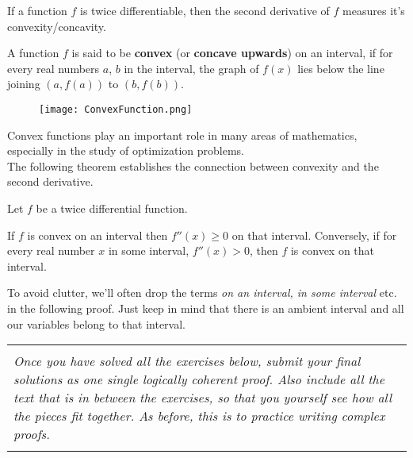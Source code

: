 If a function $f$ is twice differentiable, then the second derivative of $f$ measures it's convexity/concavity.
\begin{definition}
	A function $f$ is said to be {\bf convex} (or {\bf concave upwards}) on an interval, if for every real numbers $a$, $b$ in the interval, the graph of $f(x)$ lies below the line joining $(a,f(a))$ to $(b,f(b))$.
	\begin{figure}[H]
		\centering
		\texttt{[image: ConvexFunction.png]}
	\end{figure}
\end{definition}
Convex functions play an important role in many areas of mathematics, especially in the study of optimization problems.\\

The following theorem establishes the connection between convexity and the second derivative.
\begin{theorem}
	\label{thm:convex_functions}
	Let $f$ be a twice differential function.

	If $f$ is convex on an interval then $f''(x) \ge 0$ on that interval. Conversely, if for every real number $x$ in some interval, $f''(x) > 0$, then $f$ is convex on that interval.
\end{theorem}

\begin{remark}
	To avoid clutter, we'll often drop the terms {\it on an interval, in some interval} etc. in the following proof. Just keep in mind that there is an ambient interval and all our variables belong to that interval.
\end{remark}

\noindent \begin{tabular}{|p{\textwidth}|}
  \hline \\{\it Once you have solved all the exercises below, submit your final solutions as one single logically coherent proof. Also include all the text that is in between the exercises, so that you yourself see how all the pieces fit together. As before, this is to practice writing complex proofs.}\\\\
  \hline
\end{tabular}

